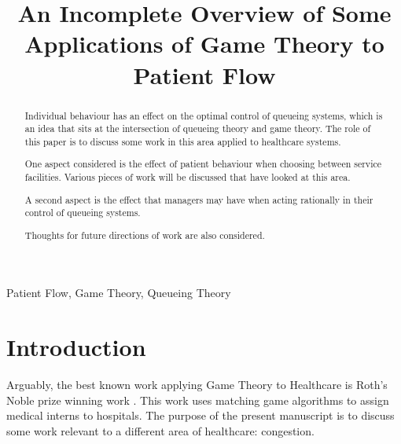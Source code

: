 \documentclass[a4paper,11pt]{article}
\title{An Incomplete Overview of Some Applications of Game Theory to Patient Flow}
\begin{document}
\maketitle

\author{
}

%
%
%

\vspace{8mm}

\begin{abstract}

Individual behaviour has an effect on the optimal control of queueing systems, which is an idea that sits at the intersection of queueing theory and game theory.
The role of this paper is to discuss some work in this area applied to healthcare systems.

One aspect considered is the effect of patient behaviour when choosing between service facilities.
Various pieces of work will be discussed that have looked at this area.

A second aspect is the effect that managers may have when acting rationally in their control of queueing systems.

Thoughts for future directions of work are also considered.
\end{abstract}

\bigskip
\begin{keywords}
Patient Flow, Game Theory, Queueing Theory

\bigskip
{}
\end{keywords}


\newpage

\section{Introduction}

Arguably, the best known work applying Game Theory to Healthcare is Roth's Noble prize winning work \cite{roth_redesign_1999}.
This work uses matching game algorithms to assign medical interns to hospitals.
The purpose of the present manuscript is to discuss some work relevant to a different area of healthcare: congestion.
\end{document}
